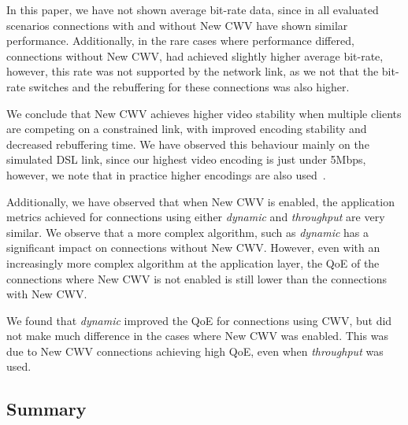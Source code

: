 \documentclass[10pt,sigconf]{acmart}
\begin{document}
In this paper, we have not shown average bit-rate data, since in all evaluated scenarios connections with and without New CWV have shown similar performance. Additionally, in the rare cases where performance differed, connections without New CWV, had achieved slightly higher average bit-rate, however, this rate was not supported by the network link, as we not that the bit-rate switches and the rebuffering for these connections was also higher.

We conclude that New CWV achieves higher video stability when multiple clients are competing on a constrained link, with improved encoding stability and decreased rebuffering time. We have observed this behaviour mainly on the simulated DSL link, since our highest video encoding is just under 5Mbps, however, we note that in practice higher encodings are also used~\cite{online-youtube-encodings}.

Additionally, we have observed that when New CWV is enabled, the application metrics achieved for connections using either \emph{dynamic} and \emph{throughput} are very similar. We observe that a more complex algorithm, such as \emph{dynamic} has a significant impact on connections without New CWV. However, even with an increasingly more complex algorithm at the application layer, the QoE of the connections where New CWV is not enabled is still lower than the connections with New CWV.

We found that \emph{dynamic} improved the QoE for connections using CWV, but did not make much difference in the cases where New CWV was enabled. This was due to New CWV connections achieving high QoE, even when \emph{throughput} was used.

\subsection{Summary}
\label{sec:summary}
\end{document}
